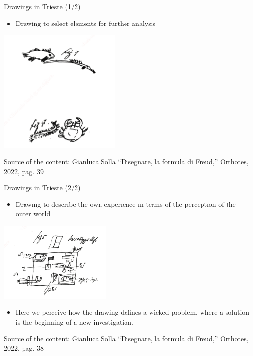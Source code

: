 \documentclass{beamer}
\begin{document}
\begin{frame}
{\centerline{Drawings in Trieste (1/2)}}

\begin{itemize}
   \item Drawing to select elements for further analysis
 \end{itemize} 


\begin{center}
 \includegraphics[width=6cm]{P2023.AIBCCSS.Drawing/selectingElementsFreud.jpg}
 
 \end{center}

\begin{center}
\tiny
Source of the content: Gianluca Solla ``Disegnare, la formula di Freud,'' Orthotes, 2022, pag. 39
\end{center}
\end{frame}

\begin{frame}
{\centerline{Drawings in Trieste (2/2)}}

\begin{itemize}
   \item Drawing to describe the own experience in terms of the perception of the outer world
 \end{itemize} 


\begin{center}
 \includegraphics[width=5.5cm]{P2023.AIBCCSS.Drawing/outerWorld.jpg}
 
 \end{center}

\begin{itemize}
   \item Here we perceive how the drawing defines a wicked problem, where a solution is the beginning of a new investigation.
 \end{itemize} 

\begin{center}
\tiny
Source of the content: Gianluca Solla ``Disegnare, la formula di Freud,'' Orthotes, 2022, pag. 38
\end{center}
\end{frame}
\end{document}
